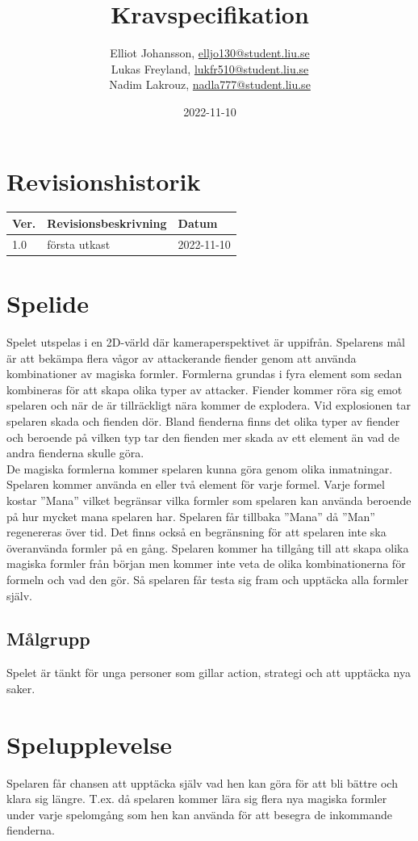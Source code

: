 \documentclass[12pt]{TDP005mall}
\author{Elliot Johansson, \url{elljo130@student.liu.se}\\
  Lukas Freyland, \url{lukfr510@student.liu.se}\\
  Nadim Lakrouz, \url{nadla777@student.liu.se}}
\title{Kravspecifikation}
\date{2022-11-10}
\begin{document}
\projectpage

\tableofcontents
\clearpage

\section{Revisionshistorik}
\begin{table}[!h]
\begin{tabularx}{\linewidth}{|l|X|l|}
\hline
Ver. & Revisionsbeskrivning & Datum \\\hline
1.0 & första utkast & 2022-11-10 \\\hline
\end{tabularx}
\end{table}


\section{Spelide}

Spelet utspelas i en 2D-värld där kameraperspektivet är uppifrån. Spelarens mål är att bekämpa flera vågor av attackerande fiender genom att använda kombinationer av magiska formler. Formlerna grundas i fyra element som sedan kombineras för att skapa olika typer av attacker. Fiender kommer röra sig emot spelaren och när de är tillräckligt nära kommer de explodera. Vid explosionen tar spelaren skada och fienden dör. Bland fienderna finns det olika typer av fiender och beroende på vilken typ tar den fienden mer skada av ett element än vad de andra fienderna skulle göra.\\
De magiska formlerna kommer spelaren kunna göra genom olika inmatningar. Spelaren kommer använda en eller två element för varje formel. Varje formel kostar ''Mana'' vilket begränsar vilka formler som spelaren kan använda beroende på hur mycket mana spelaren har. Spelaren får tillbaka ''Mana'' då ''Man'' regenereras över tid. Det finns också en begränsning för att spelaren inte ska överanvända formler på en gång.
Spelaren kommer ha tillgång till att skapa olika magiska formler från början men kommer inte veta de olika kombinationerna för formeln och vad den gör. Så spelaren får testa sig fram och upptäcka alla formler själv. 


\subsection{Målgrupp}
Spelet är tänkt för unga personer som gillar action, strategi och att upptäcka nya saker.

\section{Spelupplevelse}
Spelaren får chansen att upptäcka själv vad hen kan göra för att bli bättre och klara sig längre. T.ex. då spelaren kommer lära sig flera nya magiska formler under varje spelomgång som hen kan använda för att besegra de inkommande fienderna. 
\end{document}
